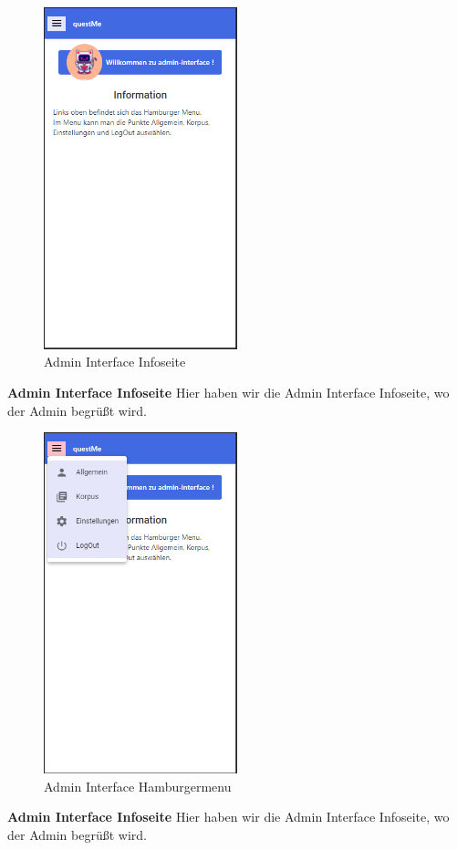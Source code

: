 \begin{figure}[H]
    \centering
    \includegraphics[width=0.5\textwidth]{bilder/prototyp UI Design/admininteface.png}
    \caption{Admin Interface Infoseite}
    \label{fig:Admin Interface Infoseite}
\end{figure}
\noindent \textbf{Admin Interface Infoseite} \newline
Hier haben wir die Admin Interface Infoseite, wo der Admin begrüßt wird.

\begin{figure}[H]
    \centering
    \includegraphics[width=0.5\textwidth]{bilder/prototyp UI Design/hamburgermenu_admininterface.png}
    \caption{Admin Interface Hamburgermenu}
    \label{fig:Admin Interface Hamburgermenu}
\end{figure}
\noindent \textbf{Admin Interface Infoseite} \newline
Hier haben wir die Admin Interface Infoseite, wo der Admin begrüßt wird.



